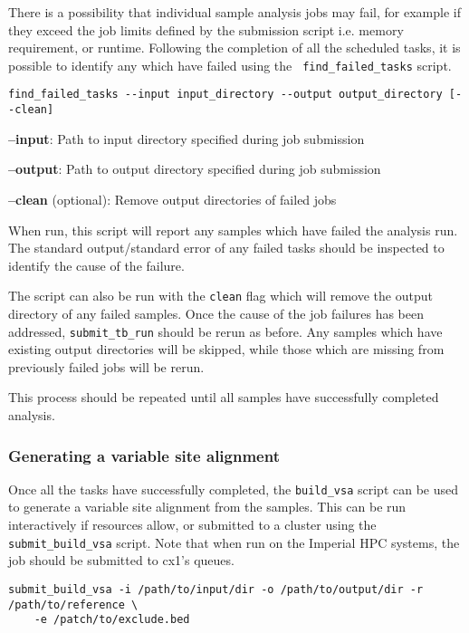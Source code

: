 \documentclass[a4paper,10pt,twoside]{article}
\newenvironment{tight_itemize}{
\begin{itemize}
  \setlength{\itemsep}{0pt}
  \setlength{\parskip}{0pt}
}{\end{itemize}}
\begin{document}
There is a possibility that individual sample analysis jobs may fail, for
example if they exceed the job limits defined by the submission script i.e.
memory requirement, or runtime. Following the completion of all the scheduled
tasks, it is possible to identify any which have failed using the {\tt
find\_failed\_tasks} script.

\begin{verbatim}
find_failed_tasks --input input_directory --output output_directory [--clean]
\end{verbatim}

\begin{tight_itemize}
\item \textbf{--input}: Path to input directory specified during job submission
\item \textbf{--output}: Path to output directory specified during job submission
\item \textbf{--clean} (optional): Remove output directories of failed jobs
\end{tight_itemize}

When run, this script will report any samples which have failed the analysis
run. The standard output/standard error of any failed tasks should be inspected
to identify the cause of the failure. 

The script can also be run with the {\tt clean} flag which will remove the
output directory of any failed samples. Once the cause of the job failures has
been addressed, {\tt submit\_tb\_run} should be rerun as before. Any samples which
have existing output directories will be skipped, while those which are missing
from previously failed jobs will be rerun. 

This process should be repeated until all samples have successfully completed analysis.

\subsubsection{Generating a variable site alignment}

Once all the tasks have successfully completed, the {\tt build\_vsa} script can
be used to generate a variable site alignment from the samples. This can be run
interactively if resources allow, or submitted to a cluster using the {\tt
submit\_build\_vsa} script. Note that when run on the Imperial HPC systems, the
job should be submitted to cx1's queues.

\begin{Verbatim}
submit_build_vsa -i /path/to/input/dir -o /path/to/output/dir -r /path/to/reference \
	-e /patch/to/exclude.bed
\end{Verbatim}
\end{document}
